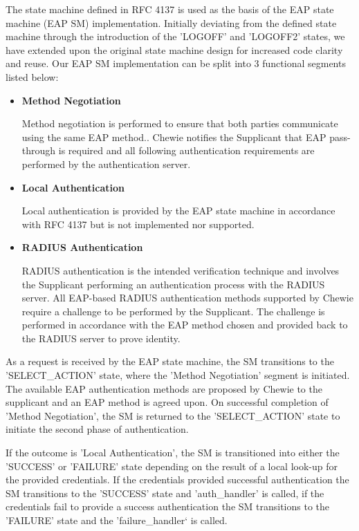 The state machine defined in RFC 4137\cite{rfc_4137} is used as the basis of the EAP state machine (EAP SM) implementation. Initially deviating from the defined state machine through the introduction of the 'LOGOFF' and 'LOGOFF2' states, we have extended upon the original state machine design for increased code clarity and reuse.
Our EAP SM implementation can be split into 3 functional segments listed below:
\begin{itemize}
    \item \textbf{Method Negotiation}
    
    Method negotiation is performed to ensure that both parties communicate using the same EAP method.\cite{rfc_3748}. Chewie notifies the Supplicant that EAP pass-through is required and all following authentication requirements are performed by the authentication server.
    
    \item \textbf{Local Authentication}
    
    Local authentication is provided by the EAP state machine in accordance with RFC 4137\cite{rfc_4137} but is not implemented nor supported.
    
    \item \textbf{RADIUS Authentication}
    
    RADIUS authentication is the intended verification technique and involves the Supplicant performing an authentication process with the RADIUS server. All EAP-based RADIUS authentication methods supported by Chewie require a challenge to be performed by the Supplicant. The challenge is performed in accordance with the EAP method chosen and provided back to the RADIUS server to prove identity.
\end{itemize}

As a request is received by the EAP state machine, the SM transitions to the 'SELECT\_ACTION' state, where the 'Method Negotiation' segment is initiated. The available EAP authentication methods are proposed by Chewie to the supplicant and an EAP method is agreed upon.
On successful completion of 'Method Negotiation', the SM is returned to the 'SELECT\_ACTION' state to initiate the second phase of authentication.

If the outcome is 'Local Authentication', the SM is transitioned into either the 'SUCCESS' or 'FAILURE' state depending on the result of a local look-up for the provided credentials. If the credentials provided successful authentication the SM transitions to the 'SUCCESS' state and 'auth\_handler' is called, if the credentials fail to provide a success authentication the SM transitions to the 'FAILURE' state and the 'failure\_handler` is called.

